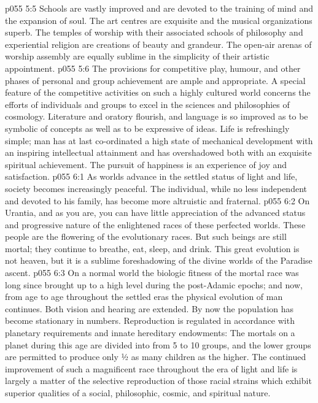 \vs p055 5:5 Schools are vastly improved and are devoted to the training of mind and the expansion of soul. The art centres are exquisite and the musical organizations superb. The temples of worship with their associated schools of philosophy and experiential religion are creations of beauty and grandeur. The open\hyp{}air arenas of worship assembly are equally sublime in the simplicity of their artistic appointment.
\vs p055 5:6 The provisions for competitive play, humour, and other phases of personal and group achievement are ample and appropriate. A special feature of the competitive activities on such a highly cultured world concerns the efforts of individuals and groups to excel in the sciences and philosophies of cosmology. Literature and oratory flourish, and language is so improved as to be symbolic of concepts as well as to be expressive of ideas. Life is refreshingly simple; man has at last co\hyp{}ordinated a high state of mechanical development with an inspiring intellectual attainment and has overshadowed both with an exquisite spiritual achievement. The pursuit of happiness is an experience of joy and satisfaction.
\vs p055 6:1 As worlds advance in the settled status of light and life, society becomes increasingly peaceful. The individual, while no less independent and devoted to his family, has become more altruistic and fraternal.
\vs p055 6:2 On Urantia, and as you are, you can have little appreciation of the advanced status and progressive nature of the enlightened races of these perfected worlds. These people are the flowering of the evolutionary races. But such beings are still mortal; they continue to breathe, eat, sleep, and drink. This great evolution is not heaven, but it is a sublime foreshadowing of the divine worlds of the Paradise ascent.
\vs p055 6:3 On a normal world the biologic fitness of the mortal race was long since brought up to a high level during the post\hyp{}Adamic epochs; and now, from age to age throughout the settled eras the physical evolution of man continues. Both vision and hearing are extended. By now the population has become stationary in numbers. Reproduction is regulated in accordance with planetary requirements and innate hereditary endowments: The mortals on a planet during this age are divided into from 5 to 10 groups, and the lower groups are permitted to produce only ½ as many children as the higher. The continued improvement of such a magnificent race throughout the era of light and life is largely a matter of the selective reproduction of those racial strains which exhibit superior qualities of a social, philosophic, cosmic, and spiritual nature.
